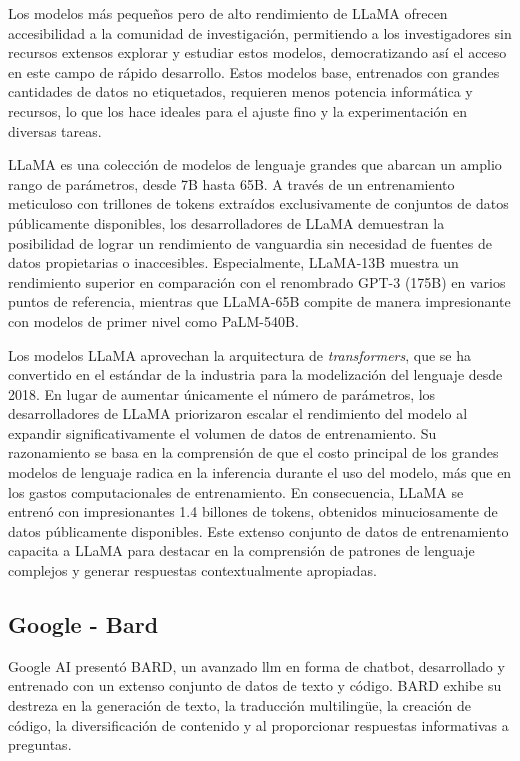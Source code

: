 Los modelos más pequeños pero de alto rendimiento de LLaMA ofrecen accesibilidad a la comunidad de investigación, permitiendo a los investigadores sin recursos extensos explorar y estudiar estos modelos, democratizando así el acceso en este campo de rápido desarrollo. Estos modelos base, entrenados con grandes cantidades de datos no etiquetados, requieren menos potencia informática y recursos, lo que los hace ideales para el ajuste fino y la experimentación en diversas tareas.

LLaMA es una colección de modelos de lenguaje grandes que abarcan un amplio rango de parámetros, desde 7B hasta 65B. A través de un entrenamiento meticuloso con trillones de tokens extraídos exclusivamente de conjuntos de datos públicamente disponibles, los desarrolladores de LLaMA demuestran la posibilidad de lograr un rendimiento de vanguardia sin necesidad de fuentes de datos propietarias o inaccesibles. Especialmente, LLaMA-13B muestra un rendimiento superior en comparación con el renombrado GPT-3 (175B) en varios puntos de referencia, mientras que LLaMA-65B compite de manera impresionante con modelos de primer nivel como PaLM-540B\cite{Murtuza}.


Los modelos LLaMA aprovechan la arquitectura de \textit{transformers}, que se ha convertido en el estándar de la industria para la modelización del lenguaje desde 2018. En lugar de aumentar únicamente el número de parámetros, los desarrolladores de LLaMA priorizaron escalar el rendimiento del modelo al expandir significativamente el volumen de datos de entrenamiento. Su razonamiento se basa en la comprensión de que el costo principal de los grandes modelos de lenguaje radica en la inferencia durante el uso del modelo, más que en los gastos computacionales de entrenamiento. En consecuencia, LLaMA se entrenó con impresionantes 1.4 billones de tokens, obtenidos minuciosamente de datos públicamente disponibles. Este extenso conjunto de datos de entrenamiento capacita a LLaMA para destacar en la comprensión de patrones de lenguaje complejos y generar respuestas contextualmente apropiadas.

\subsection{Google - Bard}

Google AI presentó BARD, un avanzado \acrfull{llm} en forma de chatbot, desarrollado y entrenado con un extenso conjunto de datos de texto y código. BARD exhibe su destreza en la generación de texto, la traducción multilingüe, la creación de código, la diversificación de contenido y al proporcionar respuestas informativas a preguntas.

